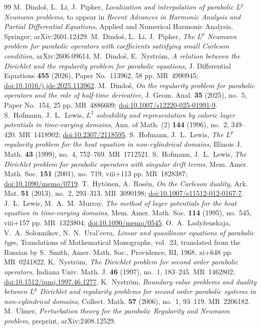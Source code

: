 \documentclass[10pt,a4paper]{amsart}
\numberwithin{equation}{section}
\begin{document}
\begin{thebibliography}{99}
 M.~Dindo\v s, L.~Li, J.~Pipher, \emph{Localization and interpolation of parabolic $L^p$ Neumann problems}, to appear in \emph{Recent Advances in Harmonic Analysis and Partial Differential Equations}, Applied and Numerical Harmonic Analysis, Springer; arXiv:2601.12429.
 M.~Dindo\v s, L.~Li, J.~Pipher, \emph{The $L^p$ Neumann problem for parabolic operators with coefficients satisfying small Carleson condition}, arXiv:2606.09614.
 M.~Dindo\v s, E.~Nystr\"om, \emph{A relation between the Dirichlet and the regularity problem for parabolic equations}, J. Differential Equations \textbf{455} (2026), Paper No.~113962, 58 pp. MR~4990945; \href{https://doi.org/10.1016/j.jde.2025.113962}{doi:10.1016/j.jde.2025.113962}.
 M.~Dindo\v s, \emph{On the regularity problem for parabolic operators and the role of half-time derivative}, J. Geom. Anal. \textbf{35} (2025), no.~5, Paper No.~154, 25 pp. MR~4886609; \href{https://doi.org/10.1007/s12220-025-01991-9}{doi:10.1007/s12220-025-01991-9}.
 S.~Hofmann, J.~L.~Lewis, \emph{$L^2$ solvability and representation by caloric layer potentials in time-varying domains}, Ann. of Math. (2) \textbf{144} (1996), no.~2, 349--420. MR~1418902; \href{https://doi.org/10.2307/2118595}{doi:10.2307/2118595}.
 S.~Hofmann, J.~L.~Lewis, \emph{The $L^p$ regularity problem for the heat equation in non-cylindrical domains}, Illinois J. Math. \textbf{43} (1999), no.~4, 752--769. MR~1712521.
 S.~Hofmann, J.~L.~Lewis, \emph{The Dirichlet problem for parabolic operators with singular drift terms}, Mem. Amer. Math. Soc. \textbf{151} (2001), no.~719, viii+113 pp. MR~1828387; \href{https://doi.org/10.1090/memo/0719}{doi:10.1090/memo/0719}.
 T.~Hyt\"onen, A.~Ros\'en, \emph{On the Carleson duality}, Ark. Mat. \textbf{51} (2013), no.~2, 293--313. MR~3090198; \href{https://doi.org/10.1007/s11512-012-0167-7}{doi:10.1007/s11512-012-0167-7}.
 J.~L.~Lewis, M.~A.~M.~Murray, \emph{The method of layer potentials for the heat equation in time-varying domains}, Mem. Amer. Math. Soc. \textbf{114} (1995), no.~545, viii+157 pp. MR~1323804; \href{https://doi.org/10.1090/memo/0545}{doi:10.1090/memo/0545}.
 O.~A.~Lady\v zenskaja, V.~A.~Solonnikov, N.~N.~Ural'ceva, \emph{Linear and quasilinear equations of parabolic type}, Translations of Mathematical Monographs, vol.~23, translated from the Russian by S.~Smith, Amer. Math. Soc., Providence, RI, 1968, xi+648 pp. MR~0241822.
 K.~Nystr\"om, \emph{The Dirichlet problem for second order parabolic operators}, Indiana Univ. Math. J. \textbf{46} (1997), no.~1, 183--245. MR~1462802; \href{https://doi.org/10.1512/iumj.1997.46.1277}{doi:10.1512/iumj.1997.46.1277}.
 K.~Nystr\"om, \emph{Boundary value problems and duality between $L^p$ Dirichlet and regularity problems for second order parabolic systems in non-cylindrical domains}, Collect. Math. \textbf{57} (2006), no.~1, 93--119. MR~2206182.
 M.~Ulmer, \emph{Perturbation theory for the parabolic Regularity and Neumann problem}, preprint, arXiv:2408.12529.
\end{thebibliography}
\end{document}
